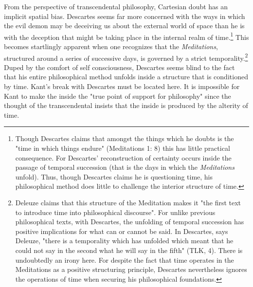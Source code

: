 From the perspective of transcendental philosophy, Cartesian doubt has an implicit spatial bias. Descartes seems far more concerned with the ways in which the evil demon may be deceiving us about the external world of space than he is with the deception that might be taking place in the internal realm of time.\footnote{Though Descartes claims that amongst the things which he doubts is the "time in which things endure" (Meditations 1: 8) this has little practical consequence. For Descartes' reconstruction of certainty occurs inside the passage of temporal succession (that is the days in which the \textit{Meditations} unfold). Thus, though Descartes claims he is questioning time, his philosophical method does little to challenge the interior structure of time.} This becomes startlingly apparent when one recognizes that the \textit{Meditations}, structured around a series of successive days, is governed by a strict temporality.\footnote{Deleuze claims that this structure of the Meditation makes it "the first text to introduce time into philosophical discourse". For unlike previous philosophical texts, with Descartes, the unfolding of temporal succession has positive implications for what can or cannot be said. In Descartes, says Deleuze, "there is a temporality which has unfolded which meant that he could not say in the second what he will say in the fifth" (TLK, 4). There is undoubtedly an irony here. For despite the fact that time operates in the Meditations as a positive structuring principle, Descartes nevertheless ignores the operations of time when securing his philosophical foundations.} Duped by the comfort of self consciousness, Descartes seems blind to the fact that his entire philosophical method unfolds inside a structure that is conditioned by time. Kant's break with Descartes must be located here. It is impossible for Kant to make the inside the "true point of support for philosophy" since the thought of the transcendental insists that the inside is produced by the alterity of time. 

